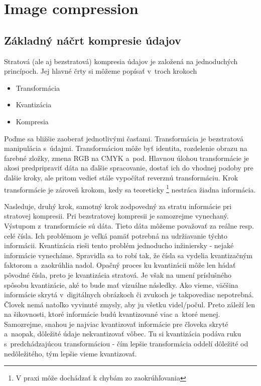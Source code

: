 \section{Image compression}

\subsection{Základný náčrt kompresie údajov}
Stratová (ale aj bezstratová) kompresia údajov je založená na
jednoduchých princípoch. Jej hlavné črty si môžeme popísať v~troch
krokoch
\begin{itemize}
\item Transformácia
\item Kvantizácia
\item Kompresia
\end{itemize}
Poďme sa bližšie zaoberať jednotlivými časťami.
Transformácia je bezstratová manipulácia s~údajmi. Transformáciou môže
byť identita, rozdelenie obrazu na farebné zložky, zmena RGB na CMYK 
a~pod. Hlavnou úlohou transformácie je akosi predpripraviť dáta na
ďalšie spracovanie, dostať ich do vhodnej podoby pre ďalšie kroky, ale
pritom vedieť stále vypočítať reverznú transformáciu. Krok
transformácie je zároveň krokom, kedy sa teoreticky
\footnote{V praxi môže dochádzať k chybám zo zaokrúhľovania}
nestráca žiadna informácia.

Nasleduje, druhý krok, samotný krok zodpovedný za stratu informácie
pri stratovej kompresii. Pri bezstratovej kompresii je samozrejme
vynechaný. Výstupom z~transformácie sú dáta. Tieto dáta môžeme
považovať za reálne resp. celé čísla. Ich problémom je veľká pamäť
potrebná na udržiavanie týchto informácii. Kvantizácia rieši tento
problém jednoducho inžiniersky - nejaké informácie vynecháme.
Spravidla sa to robí tak, že čísla sa vydelia kvantizačným faktorom 
a~zaokrúhlia nadol. Opačný proces ku kvantizácii môže len hádať pôvodné
čísla, preto je kvantizácia stratová. Je však na umení príslušného
spôsobu kvantizácie, aké to bude mať vizuálne následky. Ako vieme,
väčšina informácie skrytá v~digitálnych obrázkoch či zvukoch je
takpovediac nepotrebná. Človek nemá natoľko vyvinuté zmysly, aby ju
všetku videl/počul. Preto záleží len na šikovnosti, ktoré informácie
budú kvantizované viac a~ktoré menej. Samozrejme, snahou je najviac
kvantizovať informácie pre človeka skryté a~naopak, dôležité údaje
nekvantizovať vôbec. Tu si kvantizácia podáva ruku s~predchádzajúcou
transformáciou - čím lepšie transformácia oddelí dôležité od
nedôležitého, tým lepšie vieme kvantizovať.

